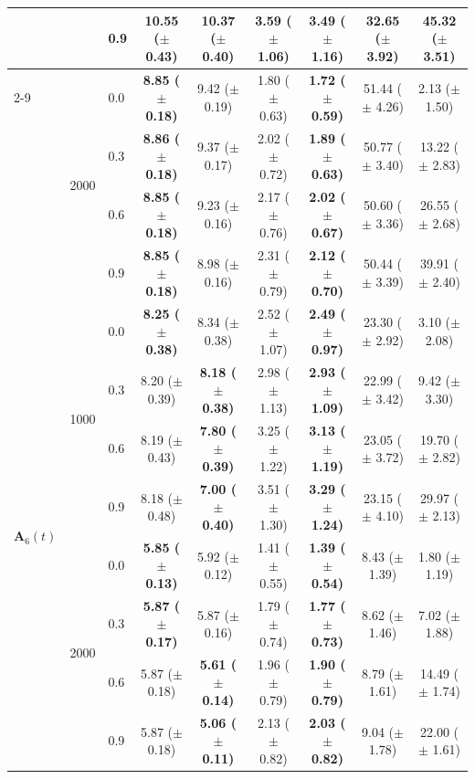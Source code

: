 \begin{table}[htbp]
{\begin{tabular}{lll|cc|cc|cc}
 &  & 0.9 & 10.55 ($\pm$ 0.43) & \textbf{10.37 ($\pm$ 0.40)} & 3.59 ($\pm$ 1.06) & \textbf{3.49 ($\pm$ 1.16)} & 32.65 ($\pm$ 3.92) & 45.32 ($\pm$ 3.51) \\
\cline{2-9}
 & \multirow{4}{*}{2000} & 0.0 & \textbf{8.85 ($\pm$ 0.18)} & 9.42 ($\pm$ 0.19) & 1.80 ($\pm$ 0.63) & \textbf{1.72 ($\pm$ 0.59)} & 51.44 ($\pm$ 4.26) & 2.13 ($\pm$ 1.50) \\
 &  & 0.3 & \textbf{8.86 ($\pm$ 0.18)} & 9.37 ($\pm$ 0.17) & 2.02 ($\pm$ 0.72) & \textbf{1.89 ($\pm$ 0.63)} & 50.77 ($\pm$ 3.40) & 13.22 ($\pm$ 2.83) \\
 &  & 0.6 & \textbf{8.85 ($\pm$ 0.18)} & 9.23 ($\pm$ 0.16) & 2.17 ($\pm$ 0.76) & \textbf{2.02 ($\pm$ 0.67)} & 50.60 ($\pm$ 3.36) & 26.55 ($\pm$ 2.68) \\
 &  & 0.9 & \textbf{8.85 ($\pm$ 0.18)} & 8.98 ($\pm$ 0.16) & 2.31 ($\pm$ 0.79) & \textbf{2.12 ($\pm$ 0.70)} & 50.44 ($\pm$ 3.39) & 39.91 ($\pm$ 2.40) \\
\hline
\multirow{8}{*}{$\mathbf{A}_6(t)$} & \multirow{4}{*}{1000} & 0.0 & \textbf{8.25 ($\pm$ 0.38)} & 8.34 ($\pm$ 0.38) & 2.52 ($\pm$ 1.07) & \textbf{2.49 ($\pm$ 0.97)} & 23.30 ($\pm$ 2.92) & 3.10 ($\pm$ 2.08) \\
 &  & 0.3 & 8.20 ($\pm$ 0.39) & \textbf{8.18 ($\pm$ 0.38)} & 2.98 ($\pm$ 1.13) & \textbf{2.93 ($\pm$ 1.09)} & 22.99 ($\pm$ 3.42) & 9.42 ($\pm$ 3.30) \\
 &  & 0.6 & 8.19 ($\pm$ 0.43) & \textbf{7.80 ($\pm$ 0.39)} & 3.25 ($\pm$ 1.22) & \textbf{3.13 ($\pm$ 1.19)} & 23.05 ($\pm$ 3.72) & 19.70 ($\pm$ 2.82) \\
 &  & 0.9 & 8.18 ($\pm$ 0.48) & \textbf{7.00 ($\pm$ 0.40)} & 3.51 ($\pm$ 1.30) & \textbf{3.29 ($\pm$ 1.24)} & 23.15 ($\pm$ 4.10) & 29.97 ($\pm$ 2.13) \\
\cline{2-9}
 & \multirow{4}{*}{2000} & 0.0 & \textbf{5.85 ($\pm$ 0.13)} & 5.92 ($\pm$ 0.12) & 1.41 ($\pm$ 0.55) & \textbf{1.39 ($\pm$ 0.54)} & 8.43 ($\pm$ 1.39) & 1.80 ($\pm$ 1.19) \\
 &  & 0.3 & \textbf{5.87 ($\pm$ 0.17)} & 5.87 ($\pm$ 0.16) & 1.79 ($\pm$ 0.74) & \textbf{1.77 ($\pm$ 0.73)} & 8.62 ($\pm$ 1.46) & 7.02 ($\pm$ 1.88) \\
 &  & 0.6 & 5.87 ($\pm$ 0.18) & \textbf{5.61 ($\pm$ 0.14)} & 1.96 ($\pm$ 0.79) & \textbf{1.90 ($\pm$ 0.79)} & 8.79 ($\pm$ 1.61) & 14.49 ($\pm$ 1.74) \\
 &  & 0.9 & 5.87 ($\pm$ 0.18) & \textbf{5.06 ($\pm$ 0.11)} & 2.13 ($\pm$ 0.82) & \textbf{2.03 ($\pm$ 0.82)} & 9.04 ($\pm$ 1.78) & 22.00 ($\pm$ 1.61) \\
\hline
\end{tabular}%
}
\end{table}

